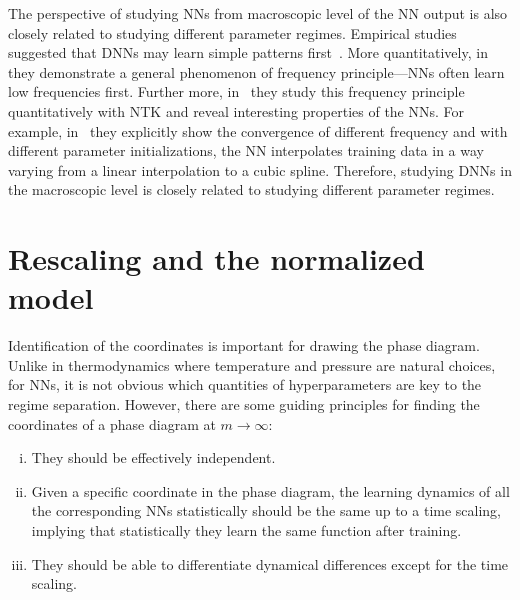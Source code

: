 \documentclass{article}
\begin{document}
The perspective of studying NNs from macroscopic level of the NN output is also closely related to studying different parameter regimes. Empirical studies suggested that DNNs may learn simple patterns first~\cite{arpit2017closer,kalimeris_sgd_2019,valle2018deep}. More quantitatively, in~\cite{xu_training_2019,xu_frequency_2019,rahaman_spectral_2019} they demonstrate a general phenomenon of frequency principle---NNs often learn low frequencies first. Further more, in~\cite{zhang2019explicitizing,basri2019convergence,yang_fine-grained_2020,cao_towards_2020} they study this frequency principle quantitatively with NTK and reveal interesting properties of the NNs. For example, in~\cite{zhang2019explicitizing} they explicitly show the convergence of different frequency and with different parameter initializations, the NN interpolates training data in a way varying from a linear interpolation to a cubic spline. Therefore, studying DNNs in the macroscopic level is closely related to studying different parameter regimes.

\section{Rescaling and the normalized model}\label{sec..Rescaling}
Identification of the coordinates is important for drawing the phase diagram. Unlike in thermodynamics where temperature and pressure are natural choices, for NNs, it is not obvious which quantities of hyperparameters are key to the regime separation. However, there are some guiding principles for finding the coordinates of a phase diagram at $m\to\infty$:
\begin{enumerate}[(i)]
    \item They should be effectively independent.
    \item Given a specific coordinate in the phase diagram, the learning dynamics of all the corresponding NNs statistically should be the same up to a time scaling, implying that statistically they learn the same function after training.
    \item They should be able to differentiate dynamical differences except for the time scaling.
\end{enumerate}
\end{document}
